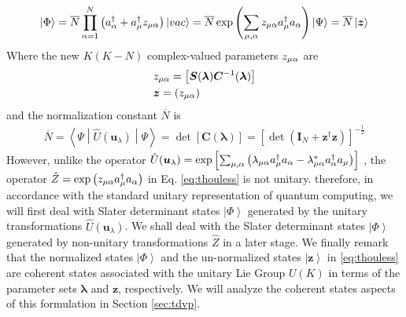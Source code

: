 \documentclass{aux/ttuthes2007}
\newcommand{\ket}[1]{\ensuremath{\left|#1\right\rangle}}
\newcommand{\sandwich}[3]{\left< #1 \middle\vert #2 \middle\vert #3 \right>}
\newcommand{\paren}[1]{\left( #1 \right)}
\newcommand{\elec}{N}
\newcommand{\orb}{K}
\newcommand{\anio}[1]{a_{\oo{#1}}}
\newcommand{\aniu}[1]{a_{\uo{#1}}}
\newcommand{\creo}[1]{a^\dagger_{\oo{#1}}}
\newcommand{\creu}[1]{a^\dagger_{\uo{#1}}}
\newcommand{\vac}{\ket{vac}}
\newcommand{\ind}[1]{{\uo #1 \oo #1}}
\newcommand{\uo}[1]{
		\IfEqCase{#1}{
			{0}{\mu}
			{1}{\nu}
			{2}{\xi}
		}[\PackageError{uo}{Undefined option to uo: #1}{}]
}
\newcommand{\oo}[1]{
		\IfEqCase{#1}{
			{0}{\alpha}
			{1}{\beta}
			{2}{\gamma}
		}[\PackageError{unocorb}{Undefined option to unuo: #1}{}]
}
\begin{document}
\begin{equation}\label{eq:thouless}
\begin{split}
	\ket\Phi 
	= \overline N \prod_{\oo 0 = 1}^\elec \paren{\creo 0 + \creu 0 z_\ind 0}\vac 
	= \overline N \exp \paren{ \sum_{\uo 0, \oo 0} z_\ind 0 \creu 0 \anio 0} \ket\Psi
	= \overline N \ket{\bm z}
\end{split}
\end{equation}
Where the new $\orb(\orb - \elec)$ complex-valued parameters $z_\ind 0$ are
\begin{equation*}
\begin{split}
	&z_\ind 0 
	= \left[ \bm S(\bm \lambda)\bm C^{-1}(\bm \lambda)\right] \\
	&\bm z = (z_\ind 0)
\end{split}
\end{equation*}
and the normalization constant $\overline N$ is
\begin{equation*}
\begin{split}
	\overline N
	= \sandwich \Psi {\hat U(\bm u_\lambda)} \Psi
	= \det [\bm C(\bm \lambda)]
	= \left[\det(\bm I_\elec + \bm z^\dagger \bm z) \right ]^{-\frac 1 2}
\end{split}
\end{equation*}
However, unlike the operator 
$\hat U(\bm u_\lambda) = \exp \left[ \sum_{\uo 0, \oo 0}\paren{\lambda_\ind 0\creu 0 \anio 0 - \lambda_\ind 0^*\creo 0 \aniu 0} \right]$
, the operator 
$\hat Z = \exp \paren{z_\ind 0\creu 0 \anio 0}$ in Eq. \ref{eq:thouless} is not unitary.
therefore, in accordance with the standard unitary representation of quantum computing,
we will first deal with Slater determinant states $\ket\Phi$ generated by the unitary transformations $\hat U(\bm u_\lambda)$.
We shall deal with the Slater determinant states $\ket\Phi$ generated by non-unitary transformations $\hat Z$ in a later stage.
We finally remark that the normalized states $\ket\Phi$ and the un-normalized states $\ket{\bm z}$ in \ref{eq:thouless} are coherent states   associated with the unitary Lie Group $U(\orb)$ in terms of the parameter sets $\bm \lambda$ and $\bm z$, respectively.
We will analyze the coherent states aspects of this formulation in Section \ref{sec:tdvp}.


\end{document}
